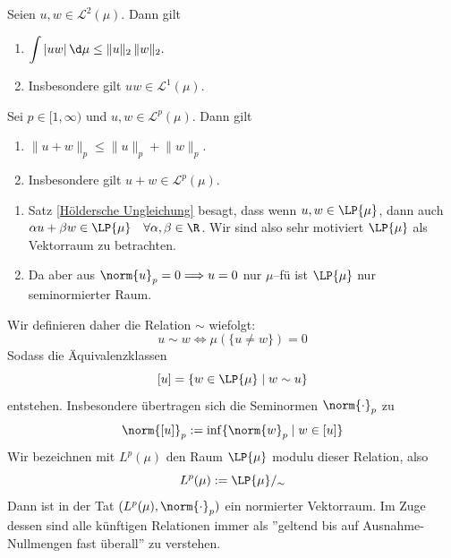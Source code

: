 \documentclass[11pt, a4paper]{article}
\begin{document}
\newpage \begin{corollary}
Seien $u,w\in \mathscr{L}^2(\mu).$ Dann gilt
\begin{enumerate}[label=\alph*)]
    \item $\displaystyle \int |uw|\,\d\mu \leq \lVert u\rVert_2\, \lVert w\rVert_2.$
    \item Insbesondere gilt $uw\in \mathscr{L}^1(\mu).$
\end{enumerate}
\end{corollary}


\begin{corollary}
Sei $p\in [1,\infty)$ und $u,w\in \mathscr{L}^p(\mu).$ Dann gilt
\begin{enumerate}[label=\alph*)]
    \item $\lVert u+w\rVert_p \leq \lVert u\rVert_p + \lVert w\rVert_p.$
    \item Insbesondere gilt $u+w\in \mathscr{L}^p(\mu).$
\end{enumerate}
\end{corollary}

\begin{note}\mbox{}\par
\begin{enumerate}[label=\alph*)]
    \item Satz \ref{Höldersche Ungleichung} besagt, dass wenn $u,w\in \LP{\mu}$, dann auch $\alpha u +\beta w \in \LP{\mu} \quad \forall \alpha, \beta \in \R$. Wir sind also sehr motiviert $\LP{\mu}$ als Vektorraum zu betrachten. 
    \item Da aber aus $\norm{u}_p = 0 \Longrightarrow u = 0$ nur $\mu$--fü ist $\LP{\mu}$ nur seminormierter Raum.   
\end{enumerate}
\end{note}

\begin{definition}
    Wir definieren daher die Relation $\sim$ wiefolgt:
    $$u\sim w \Longleftrightarrow \mu(\{u\neq w \}) = 0$$
    Sodass die Äquivalenzklassen
    $$[u]= \{w\in \LP{\mu} \mid w\sim u\}$$
    entstehen. Insbesondere übertragen sich die Seminormen $\norm{\cdot}_p$ zu
    $$\norm{[u]}_p := \inf\{\norm{w}_p \mid w\in [u]\}$$
    Wir bezeichnen mit $L^p(\mu)$ den Raum $\LP{\mu}$ modulu dieser Relation, also
    $$L^p(\mu) := \LP{\mu}/_\sim$$
    Dann ist in der Tat $(L^p(\mu), \norm{\cdot}_p)$ ein normierter Vektorraum. Im Zuge dessen sind alle künftigen Relationen immer als ''geltend bis auf Ausnahme-Nullmengen fast überall'' zu verstehen.
\end{definition}
\end{document}
